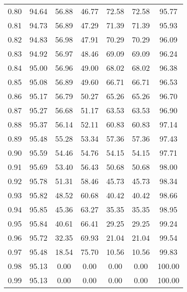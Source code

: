 \begin{tabular}{|c|c|c|c|c|c|c|}
      0.80 &     94.64 &     56.88 &      46.77 &   72.58 &      72.58 &         95.77 \\
      0.81 &     94.73 &     56.89 &      47.29 &   71.39 &      71.39 &         95.93 \\
      0.82 &     94.83 &     56.98 &      47.91 &   70.29 &      70.29 &         96.09 \\
      0.83 &     94.92 &     56.97 &      48.46 &   69.09 &      69.09 &         96.24 \\
      0.84 &     95.00 &     56.96 &      49.00 &   68.02 &      68.02 &         96.38 \\
      0.85 &     95.08 &     56.89 &      49.60 &   66.71 &      66.71 &         96.53 \\
      0.86 &     95.17 &     56.79 &      50.27 &   65.26 &      65.26 &         96.70 \\
      0.87 &     95.27 &     56.68 &      51.17 &   63.53 &      63.53 &         96.90 \\
      0.88 &     95.37 &     56.14 &      52.11 &   60.83 &      60.83 &         97.14 \\
      0.89 &     95.48 &     55.28 &      53.34 &   57.36 &      57.36 &         97.43 \\
      0.90 &     95.59 &     54.46 &      54.76 &   54.15 &      54.15 &         97.71 \\
      0.91 &     95.69 &     53.40 &      56.43 &   50.68 &      50.68 &         98.00 \\
      0.92 &     95.78 &     51.31 &      58.46 &   45.73 &      45.73 &         98.34 \\
      0.93 &     95.82 &     48.52 &      60.68 &   40.42 &      40.42 &         98.66 \\
      0.94 &     95.85 &     45.36 &      63.27 &   35.35 &      35.35 &         98.95 \\
      0.95 &     95.84 &     40.61 &      66.41 &   29.25 &      29.25 &         99.24 \\
      0.96 &     95.72 &     32.35 &      69.93 &   21.04 &      21.04 &         99.54 \\
      0.97 &     95.48 &     18.54 &      75.70 &   10.56 &      10.56 &         99.83 \\
      0.98 &     95.13 &      0.00 &       0.00 &    0.00 &       0.00 &        100.00 \\
      0.99 &     95.13 &      0.00 &       0.00 &    0.00 &       0.00 &        100.00 \\
\bottomrule
\end{tabular}
